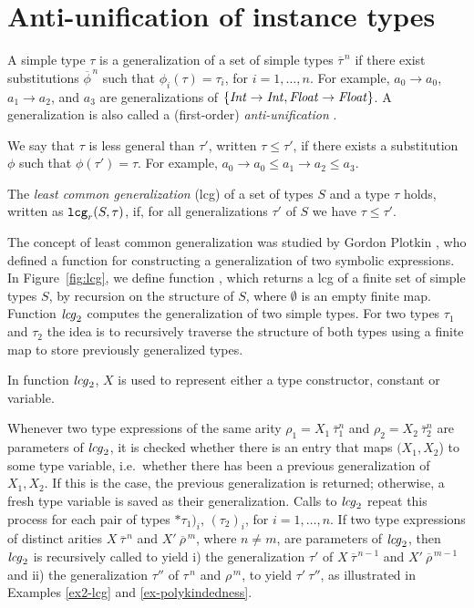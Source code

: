 \section{Anti-unification of instance types}
\label{sec:anti-unif}

A simple type $\tau$ is a generalization of a set of simple types
$\overline{\tau}^{\,n}$ if there exist substitutions
$\overline{\phi}^{\,n}$ such that $\phi_i(\tau)=\tau_i$, for
$i=1,\ldots,n$. For example, $a_0 \rightarrow a_0$, $a_1 \rightarrow
a_2$, and $a_3$ are generalizations of $\{ {\it Int\/} \rightarrow {\it Int\/},
{\it Float\/} \rightarrow {\it Float\/}\}$. A generalization is also called a
(first-order) {\em anti-unification\/} \cite{ModelTheory2012}.

We say that $\tau$ is less general than $\tau'$, written $\tau \leq
\tau'$, if there exists a substitution $\phi$ such that $\phi(\tau') =
\tau$.  For example, $a_0 \rightarrow a_0 \leq a_1 \rightarrow a_2
\leq a_3$.

The {\it least common generalization} (lcg) of a set of types
$S$ and a type $\tau$ holds, written as ${\tt lcg}_r(S,\tau)$, if, for all generalizations $\tau'$ of
$S$ we have $\tau \leq \tau'$.

The concept of least common generalization was studied by Gordon
Plotkin \cite{plotkin1970note,plotkin1971further}, who defined a
function for constructing a generalization of two symbolic
expressions.  In Figure~\ref{fig:lcg}, we define function \lcg, which
returns a lcg of a finite set of simple types $S$, by recursion on the
structure of $S$, where $\emptyset$ is an empty finite map. Function
${\it lcg\/}_2$ computes the generalization of two simple types. For two
types $\tau_1$ and $\tau_2$ the idea is to recursively traverse the
structure of both types using a finite map to store previously
generalized types.

In function ${\it lcg\/}_2$, $X$ is used to represent either a type
constructor, constant or variable.

Whenever two type expressions of the same arity $\rho_1 =
X_1\:\bar{\tau}_1^n$ and $\rho_2 = X_2\:\bar{\tau}_2^n$ are parameters
of ${\it lcg\/}_2$, it is checked whether there is an entry that maps $(X_1,
X_2$) to some type variable, i.e.~whether there has been a previous
generalization of $X_1, X_2$. If this is the case, the previous
generalization is returned; otherwise, a fresh type variable is saved
as their generalization. Calls to ${\it lcg\/}_2$ repeat this process for
each pair of types $*{\tau}_1)_i$, $({\tau}_2)_i$, for
$i=1,\ldots,n$. If two type expressions of distinct arities $X \:
\overline{\tau}^{\,n}$ and $X'\: \overline{\rho}^{\,m}$, where
$n\not=m$, are parameters of ${\it lcg\/}_2$, then ${\it lcg\/}_2$ is recursively
called to yield i) the generalization $\tau'$ of $X \:
\overline{\tau}^{\,n-1}$ and $X'\: \overline{\rho}^{\,m-1}$ and ii)
the generalization $\tau''$ of $\tau^{\,n}$ and $\rho^{\,m}$, to yield
$\tau'\:\tau''$, as illustrated in Examples \ref{ex2-lcg} and
\ref{ex-polykindedness}.


